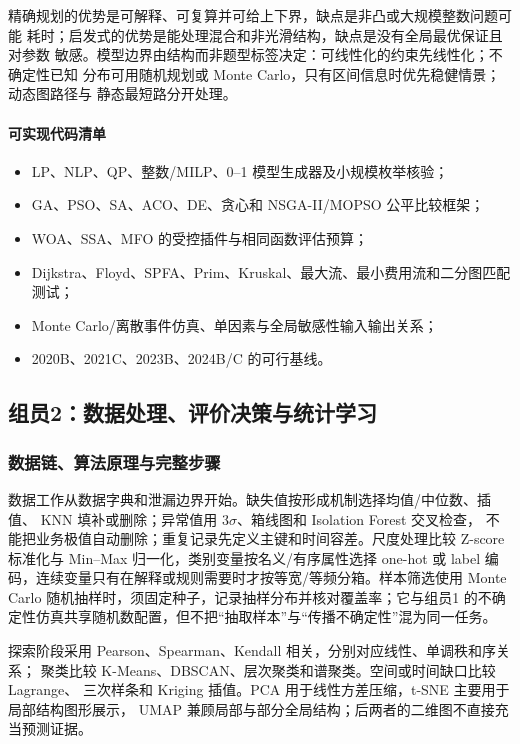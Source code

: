 \documentclass[UTF8,a4paper,12pt]{ctexart}
\begin{document}
精确规划的优势是可解释、可复算并可给上下界，缺点是非凸或大规模整数问题可能
耗时；启发式的优势是能处理混合和非光滑结构，缺点是没有全局最优保证且对参数
敏感。模型边界由结构而非题型标签决定：可线性化的约束先线性化；不确定性已知
分布可用随机规划或 Monte Carlo，只有区间信息时优先稳健情景；动态图路径与
静态最短路分开处理。

\paragraph{可实现代码清单}
\begin{itemize}
  \item LP、NLP、QP、整数/MILP、0--1 模型生成器及小规模枚举核验；
  \item GA、PSO、SA、ACO、DE、贪心和 NSGA-II/MOPSO 公平比较框架；
  \item WOA、SSA、MFO 的受控插件与相同函数评估预算；
  \item Dijkstra、Floyd、SPFA、Prim、Kruskal、最大流、最小费用流和二分图匹配测试；
  \item Monte Carlo/离散事件仿真、单因素与全局敏感性输入输出关系；
  \item 2020B、2021C、2023B、2024B/C 的可行基线。
\end{itemize}

\subsection{组员2：数据处理、评价决策与统计学习}

\subsubsection{数据链、算法原理与完整步骤}

数据工作从数据字典和泄漏边界开始。缺失值按形成机制选择均值/中位数、插值、
KNN 填补或删除；异常值用 $3\sigma$、箱线图和 Isolation Forest 交叉检查，
不能把业务极值自动删除；重复记录先定义主键和时间容差。尺度处理比较
Z-score 标准化与 Min--Max 归一化，类别变量按名义/有序属性选择 one-hot 或
label 编码，连续变量只有在解释或规则需要时才按等宽/等频分箱。样本筛选使用
Monte Carlo 随机抽样时，须固定种子，记录抽样分布并核对覆盖率；它与组员1
的不确定性仿真共享随机数配置，但不把“抽取样本”与“传播不确定性”混为同一任务。

探索阶段采用 Pearson、Spearman、Kendall 相关，分别对应线性、单调秩和序关系；
聚类比较 K-Means、DBSCAN、层次聚类和谱聚类。空间或时间缺口比较 Lagrange、
三次样条和 Kriging 插值。PCA 用于线性方差压缩，t-SNE 主要用于局部结构图形展示，
UMAP 兼顾局部与部分全局结构；后两者的二维图不直接充当预测证据。
\end{document}
